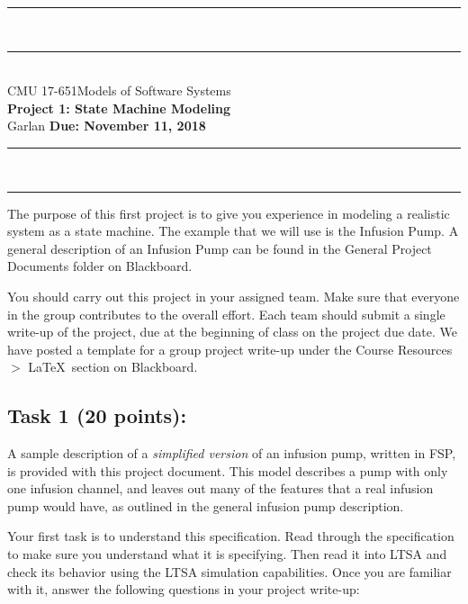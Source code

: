 ﻿\documentclass{article}
\newcommand{\head}{\subsection*}
\begin{document}
\begin{center}
\rule{\textwidth}{1.5pt} \\ \rule[10pt]{\textwidth}{1pt}\\
CMU 17-651\hfill Models of Software Systems\\[3ex]
{\Large\bf Project 1: State Machine Modeling}\\[3ex]
Garlan \hfill {\bf Due: November 11, 2018} \rule{\textwidth}{1pt}
\\\rule[9.5pt]{\textwidth}{1.5pt}
\end{center}


The purpose of this first project is to give you experience in
modeling a realistic system as a state machine. The example that we
will use is the Infusion Pump. A general description of an Infusion
Pump can be found in the General Project Documents folder on
Blackboard.


\bigskip You should carry out this project in your assigned team. Make sure that everyone in the group contributes to the overall effort. Each team should submit a single write-up of the project,
due at the beginning of class on the project due date. We have
posted a template for a group project write-up under the Course
Resources $>$ \LaTeX~section on Blackboard.


\head{Task 1 (20 points):}


A sample description of a \emph{simplified version} of an infusion
pump, written in FSP, is provided with this project document. This
model describes a pump with only one infusion channel, and leaves
out many of the features that a real infusion pump would have, as
outlined in the general infusion pump description.


\bigskip Your first task is to understand this specification. Read
through the specification to make sure you understand what it is
specifying. Then read it into LTSA and check its behavior using the
LTSA simulation capabilities. Once you are familiar with it, answer
the following questions in your project write-up:
\end{document}

